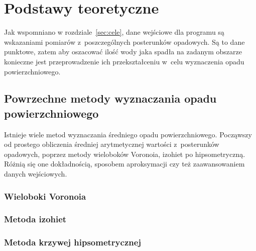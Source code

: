 \chapter{Podstawy teoretyczne}
Jak wspomniano w rozdziale~\ref{sec:cele}, dane wejściowe dla programu są wskazaniami pomiarów z~poszczególnych posterunków opadowych. Są to dane punktowe, zatem aby oszacować ilość wody jaka spadła na zadanym obszarze konieczne jest przeprowadzenie ich przekształceniu w~celu wyznaczenia opadu powierzchniowego.


\section{Powrzechne metody wyznaczania opadu powierzchniowego}

Istnieje wiele metod wyznaczania średniego opadu powierzchniowego. Począwszy od prostego obliczenia średniej arytmetycznej wartości z~posterunków opadowych, poprzez metody wieloboków Voronoia, izohiet po hipsometryczną. Różnią się one dokładnością, sposobem aproksymacji czy też zaawansowaniem danych wejściowych.

\subsection{Wieloboki Voronoia}
\subsection{Metoda izohiet}
\subsection{Metoda krzywej hipsometrycznej}

